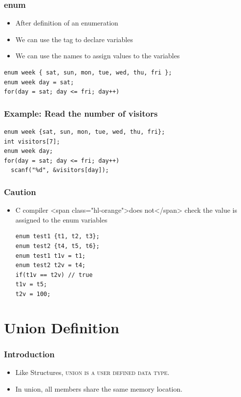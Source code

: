 \documentclass{../c-lecture}
\begin{document}
\begin{frame}[fragile]
  \frametitle{enum}
  \begin{itemize}
    \item After definition of an enumeration
    \item We can use the tag to declare variables
    \item We can use the names to assign values to the variables
  \end{itemize}
  \begin{verbatim}
enum week { sat, sun, mon, tue, wed, thu, fri };
enum week day = sat;
for(day = sat; day <= fri; day++)
  \end{verbatim}
\end{frame}

\begin{frame}[fragile]
  \frametitle{Example: Read the number of visitors}
  \begin{verbatim}
enum week {sat, sun, mon, tue, wed, thu, fri};
int visitors[7];
enum week day;
for(day = sat; day <= fri; day++)
  scanf("%d", &visitors[day]);
  \end{verbatim}
\end{frame}

\begin{frame}[fragile]
  \frametitle{Caution}
  \begin{itemize}
    \item
      C compiler <span class="hl-orange">does not</span> check the value is
      assigned to the enum variables

    \begin{verbatim}
enum test1 {t1, t2, t3};
enum test2 {t4, t5, t6};
enum test1 t1v = t1;
enum test2 t2v = t4;
if(t1v == t2v) // true
t1v = t5;
t2v = 100;
    \end{verbatim}
  \end{itemize}
\end{frame}

\section{Union Definition}

\begin{frame}
  \frametitle{Introduction}
  \begin{itemize}
    \item
      Like Structures,
      \textsc{\color{Orange} union is a user defined data type}.
    \item In union, all members share the same memory location.
  \end{itemize}
\end{frame}
\end{document}
